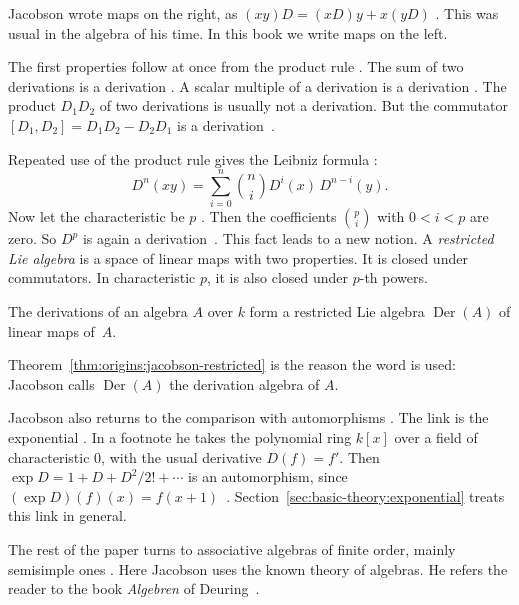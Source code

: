 Jacobson wrote maps on the right, as $(xy)D = (xD)y + x(yD)$
\cite[p.~206]{Jacobson1937}. This was usual in the algebra of his time. In
this book we write maps on the left.

The first properties follow at once from the product rule
\cite[p.~207]{Jacobson1937}. The sum of two derivations is a derivation
\cite[p.~207]{Jacobson1937}. A scalar multiple of a derivation is a derivation
\cite[p.~207]{Jacobson1937}. The product $D_1D_2$ of two derivations is
usually not a derivation. But the commutator $[D_1,D_2] = D_1D_2 - D_2D_1$ is
a derivation~\cite[p.~207]{Jacobson1937}.

Repeated use of the product rule gives the Leibniz formula
\cite[p.~207, (7)--(8)]{Jacobson1937}:
\[
D^n(xy) = \sum_{i=0}^{n} \binom{n}{i} D^{i}(x)\, D^{n-i}(y).
\]
Now let the characteristic be $p$ \cite[p.~207]{Jacobson1937}. Then the
coefficients $\binom{p}{i}$ with
$0 < i < p$ are zero. So $D^p$ is again a
derivation~\cite[p.~207, (7)--(8)]{Jacobson1937}. This fact leads to a new
notion. A \emph{restricted Lie algebra} is a space of linear maps with two
properties. It is closed under commutators. In characteristic $p$, it is also
closed under $p$-th powers.

\begin{theorem}\label{thm:origins:jacobson-restricted}
The derivations of an algebra $A$ over $k$ form a restricted Lie algebra
$\operatorname{Der}(A)$ of linear maps of~$A$.
\end{theorem}

Theorem~\ref{thm:origins:jacobson-restricted} is the reason the word is used:
Jacobson calls $\operatorname{Der}(A)$ the derivation algebra of $A$.

Jacobson also returns to the comparison with automorphisms \cite[p.~206,
footnote]{Jacobson1937}. The link is the exponential \cite[p.~206,
footnote]{Jacobson1937}. In a footnote he takes the polynomial ring $k[x]$
over a field of characteristic $0$, with the usual derivative $D(f) = f'$.
Then $\exp D = 1 + D + D^2/2! + \cdots$ is an automorphism, since $(\exp
D)(f)(x) = f(x+1)$~\cite[p.~206, footnote]{Jacobson1937}.
Section~\ref{sec:basic-theory:exponential} treats this link in general.

The rest of the paper turns to associative algebras of finite order, mainly
semisimple ones \cite[p.~206]{Jacobson1937}. Here Jacobson uses the known
theory of algebras. He refers the reader to the book \emph{Algebren} of
Deuring~\cite[p.~206]{Jacobson1937}.

